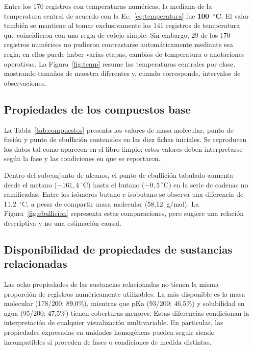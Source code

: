 Entre los 170 registros con temperaturas numéricas, la mediana de la temperatura central de acuerdo con la Ec.~\eqref{eq:temperatura} fue \textbf{100~$^\circ$C}. El valor también se mantiene al tomar exclusivamente los 141 registros de temperatura que coincidieron con una regla de cotejo simple. Sin embargo, 29 de los 170 registros numéricos no pudieron contrastarse automáticamente mediante esa regla; en ellos puede haber varias etapas, cambios de temperatura o anotaciones operativas. La Figura~\ref{fig:temp} resume las temperaturas centrales por clase, mostrando tamaños de muestra diferentes y, cuando corresponde, intervalos de observaciones.

\subsection{Propiedades de los compuestos base}
La Tabla~\ref{tab:compuestos} presenta los valores de masa molecular, punto de fusión y punto de ebullición contenidos en las diez fichas iniciales. Se reproducen los datos tal como aparecen en el libro limpio; estos valores deben interpretarse según la fase y las condiciones en que se reportaron.



Dentro del subconjunto de alcanos, el punto de ebullición tabulado aumenta desde el metano ($-161{,}4~^\circ$C) hasta el butano ($-0{,}5~^\circ$C) en la serie de cadenas no ramificadas. Entre los isómeros butano e isobutano se observa una diferencia de 11,2~$^\circ$C, a pesar de compartir masa molecular (58,12~g/mol). La Figura~\ref{fig:ebullicion} representa estas comparaciones, pero sugiere una relación descriptiva y no una estimación causal.

\subsection{Disponibilidad de propiedades de sustancias relacionadas}
Las ocho propiedades de las sustancias relacionadas no tienen la misma proporción de registros numéricamente utilizables. La más disponible es la masa molecular (178/200; 89,0\%), mientras que pKa (93/200; 46,5\%) y solubilidad en agua (95/200; 47,5\%) tienen coberturas menores. Estas diferencias condicionan la interpretación de cualquier visualización multivariable. En particular, las propiedades expresadas en unidades homogéneas pueden seguir siendo incompatibles si proceden de fases o condiciones de medida distintas.

